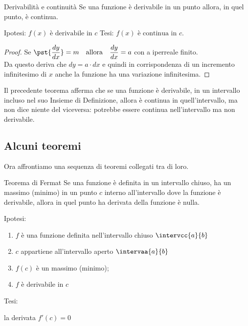 \begin{newtheo}{Derivabilità e continuità}{}
Se una funzione è derivabile in un punto allora, in quel punto, è continua.
\end{newtheo}

\noindent Ipotesi: 
\(f(x) \text{ è derivabile in } c\)
\tab Tesi: 
\(f(x) \text{ è continua in } c\).

\begin{proof}
Se \(\pst{\dfrac{dy}{dx}}=m \quad \text{allora} \quad 
\dfrac{dy}{dx}=a\) \quad con a iperreale finito.\\
Da questo deriva che \(dy= a \cdot dx\) e quindi in corrispondenza di 
un incremento infinitesimo di \(x\) anche la funzione ha una 
variazione infinitesima.
\end{proof}
\begin{newoss}{}{}
Il precedente teorema afferma che se una funzione è derivabile, in un 
intervallo incluso nel suo Insieme di Definizione, allora è continua in 
quell'intervallo, ma non dice niente del viceversa: potrebbe essere 
continua nell'intervallo ma non derivabile.
\end{newoss}

\subsection{Alcuni teoremi}
\label{subsec:cont_teoremi}

Ora affrontiamo una sequenza di teoremi collegati tra di loro.

\begin{newtheo}{Teorema di Fermat}{}
Se una funzione è 
definita in un intervallo chiuso, 
ha un massimo (minimo) in un punto \(c\) interno all'intervallo 
dove la funzione è derivabile, 
allora in quel punto ha derivata della funzione è nulla.
\end{newtheo}

\begin{minipage}{.54\textwidth}
\noindent Ipotesi:
\begin{enumerate}[nosep]
 \item \(f\) è una funzione definita nell'intervallo chiuso 
\(\intervcc{a}{b}\)
 \item \(c\) appartiene all'intervallo aperto \(\intervaa{a}{b}\)
 \item \(f(c)\) è un massimo (minimo);
 \item \(f\) è derivabile in \(c\)
\end{enumerate}

\noindent Tesi: 

\hspace{4mm} la derivata \(f'(c)=0\)
\end{minipage}
\hfill
\begin{minipage}{.42\textwidth}
\begin{center} \tfermat \end{center}
\end{minipage}

